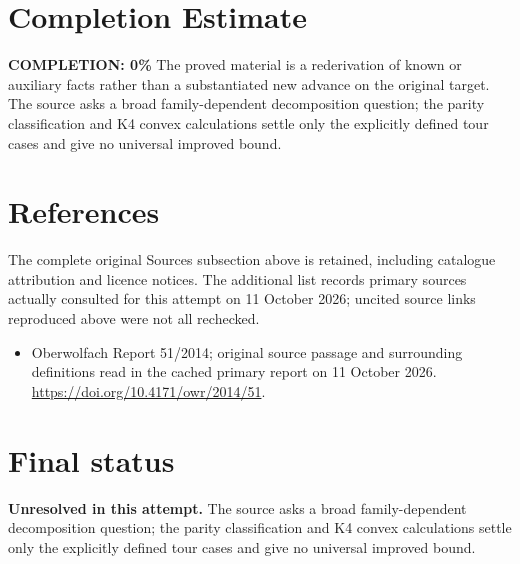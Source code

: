 \documentclass[11pt]{article}
\begin{document}
\section{Completion Estimate}
\noindent\textbf{COMPLETION: 0\%}
The proved material is a rederivation of known or auxiliary facts rather than a substantiated new advance on the original target. The source asks a broad family-dependent decomposition question; the parity classification and K4 convex calculations settle only the explicitly defined tour cases and give no universal improved bound.
\section{References}
The complete original Sources subsection above is retained, including catalogue attribution and licence notices. The additional list records primary sources actually consulted for this attempt on 11 October 2026; uncited source links reproduced above were not all rechecked.
\begin{itemize}
\item Oberwolfach Report 51/2014; original source passage and surrounding definitions read in the cached primary report on 11 October 2026. \url{https://doi.org/10.4171/owr/2014/51}.
\end{itemize}
\section{Final status}
\textbf{Unresolved in this attempt.} The source asks a broad family-dependent decomposition question; the parity classification and K4 convex calculations settle only the explicitly defined tour cases and give no universal improved bound.
\end{document}
